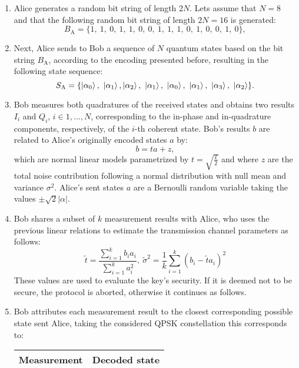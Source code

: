 \begin{enumerate}
\item Alice generates a random bit string of length $2N$. Lets assume that $N=8$ and that the following random bit string of length $2N=16$ is generated:
\begin{equation*}
B_\text{A}=\lbrace1,~1,~0,~1,~1,~0,~0,~1,~1,~1,~0,~1,~0,~0,~1,~0\rbrace,
\end{equation*}
\item Next, Alice sends to Bob a sequence of $N$ quantum states based on the bit string $B_\text{A}$, according to the encoding presented before, resulting in the following state sequence:
\begin{equation*}
S_\text{A}=\lbrace\ket{\alpha_0},~\ket{\alpha_1},\ket{\alpha_2},~\ket{\alpha_1},~\ket{\alpha_0},~\ket{\alpha_1},~\ket{\alpha_3},~\ket{\alpha_2}\rbrace.
\end{equation*}
\item Bob measures both quadratures of the received states and obtains two results $I_i$ and $Q_i$, $i\in1,...,N$, corresponding to the in-phase and in-quadrature components, respectively, of the $i$-th coherent state. Bob's results $b$ are related to Alice's originally encoded states $a$ by:
\begin{equation*}
b=ta+z,
\end{equation*}
which are normal linear models parametrized by $t=\sqrt{\frac{T}{2}}$ and where $z$ are the total noise contribution following a normal distribution with null mean and variance $\sigma^2$. Alice's sent states $a$ are a Bernoulli random variable taking the values $\pm\sqrt{2}|\alpha|$. 
\item Bob shares a subset of $k$ measurement results with Alice, who uses the previous linear relations to estimate the transmission channel parameters as follows:
\begin{equation*}
\tilde{t}=\frac{\sum^k_{i=1}b_ia_i}{\sum^k_{i=1}a_i^2},~\tilde{\sigma}^2=\frac{1}{k}\sum^k_{i=1}(b_i-\tilde{t}a_i)^2
\end{equation*}
These values are used to evaluate the key's security. If it is deemed not to be secure, the protocol is aborted, otherwise it continues as follows.
\item Bob attributes each measurement result to the closest corresponding possible state sent Alice, taking the considered QPSK constellation this corresponds to:
\begin{table}[H]
\centering
\begin{tabular}{c|c}
\textbf{Measurement} & \textbf{Decoded state} \\ \hline

\end{tabular}
\end{table}
\end{enumerate}
